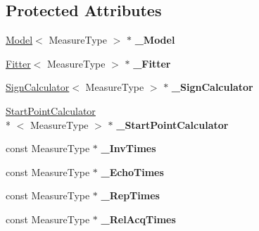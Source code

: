 \subsection*{Protected Attributes}
\begin{DoxyCompactItemize}
\item 
\hypertarget{class_ox_1_1_calculator_a37dee4f1bb2fcae66c6710a642fe6d7b}{\hyperlink{class_ox_1_1_model}{Model}$<$ Measure\-Type $>$ $\ast$ {\bfseries \-\_\-\-Model}}\label{class_ox_1_1_calculator_a37dee4f1bb2fcae66c6710a642fe6d7b}

\item 
\hypertarget{class_ox_1_1_calculator_ae00ef8e7db2e9eaa86b8649815246bf9}{\hyperlink{class_ox_1_1_fitter}{Fitter}$<$ Measure\-Type $>$ $\ast$ {\bfseries \-\_\-\-Fitter}}\label{class_ox_1_1_calculator_ae00ef8e7db2e9eaa86b8649815246bf9}

\item 
\hypertarget{class_ox_1_1_calculator_a0655f664d37e70e589bb8526175f19bb}{\hyperlink{class_ox_1_1_sign_calculator}{Sign\-Calculator}$<$ Measure\-Type $>$ $\ast$ {\bfseries \-\_\-\-Sign\-Calculator}}\label{class_ox_1_1_calculator_a0655f664d37e70e589bb8526175f19bb}

\item 
\hypertarget{class_ox_1_1_calculator_a8873b376837e41f40e2a9286a9ea5896}{\hyperlink{class_ox_1_1_start_point_calculator}{Start\-Point\-Calculator}\\*
$<$ Measure\-Type $>$ $\ast$ {\bfseries \-\_\-\-Start\-Point\-Calculator}}\label{class_ox_1_1_calculator_a8873b376837e41f40e2a9286a9ea5896}

\item 
\hypertarget{class_ox_1_1_calculator_ab5f694e40a431677359b6933154eebc0}{const Measure\-Type $\ast$ {\bfseries \-\_\-\-Inv\-Times}}\label{class_ox_1_1_calculator_ab5f694e40a431677359b6933154eebc0}

\item 
\hypertarget{class_ox_1_1_calculator_acc5f2033f9e72e394abae75abdb70076}{const Measure\-Type $\ast$ {\bfseries \-\_\-\-Echo\-Times}}\label{class_ox_1_1_calculator_acc5f2033f9e72e394abae75abdb70076}

\item 
\hypertarget{class_ox_1_1_calculator_acaa46125d5a97260020dcb8e880d8ca4}{const Measure\-Type $\ast$ {\bfseries \-\_\-\-Rep\-Times}}\label{class_ox_1_1_calculator_acaa46125d5a97260020dcb8e880d8ca4}

\item 
\hypertarget{class_ox_1_1_calculator_adc51d44af4e1e42ccda6e49efd618d07}{const Measure\-Type $\ast$ {\bfseries \-\_\-\-Rel\-Acq\-Times}}\label{class_ox_1_1_calculator_adc51d44af4e1e42ccda6e49efd618d07}


\end{DoxyCompactItemize}
